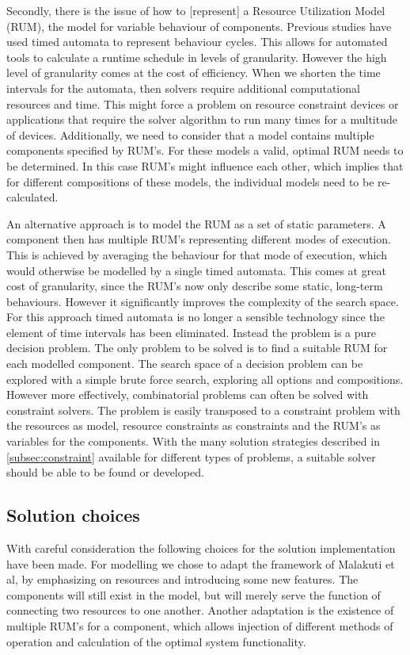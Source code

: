 Secondly, there is the issue of how to [represent] a Resource Utilization Model (RUM)\cite{steven-te-brinke}, the model for variable behaviour of components. Previous studies \cite{rum_basis_89, steven-te-brinke} have used timed automata to represent behaviour cycles. This allows for automated tools to calculate a runtime schedule in levels of granularity. However the high level of granularity comes at the cost of efficiency. When we shorten the time intervals for the automata, then solvers require additional computational resources and time. This might force a problem on resource constraint devices or applications that require the solver algorithm to run many times for a multitude of devices. Additionally, we need to consider that a model contains multiple components specified by RUM's. For these models a valid, optimal RUM needs to be determined. In this case RUM's might influence each other, which implies that for different compositions of these models, the individual models need to be re-calculated. %

An alternative approach is to model the RUM as a set of static parameters. A component then has multiple RUM's representing different modes of execution. This is achieved by averaging the behaviour for that mode of execution, which would otherwise be modelled by a single timed automata. This comes at great cost of granularity, since the RUM's now only describe some static, long-term behaviours. However it significantly improves the complexity of the search space. For this approach timed automata is no longer a sensible technology since the element of time intervals has been eliminated. Instead the problem is a pure decision problem\cite{decision_problem}. The only problem to be solved is to find a suitable RUM for each modelled component. The search space of a decision problem can be explored with a simple brute force search, exploring all options and compositions. However more effectively, combinatorial problems can often be solved with constraint solvers. The problem is easily transposed to a constraint problem with the resources as model, resource constraints as constraints and the RUM's as variables for the components. With the many solution strategies described in \ref{subsec:constraint} available for different types of problems, a suitable solver should be able to be found or developed.

\subsection{Solution choices}
\label{sub:choices}
With careful consideration the following choices for the solution implementation have been made. For modelling we chose to adapt the framework of Malakuti et al\cite{steven_te_brinke}, by emphasizing on resources and introducing some new features. The components will still exist in the model, but will merely serve the function of connecting two resources to one another. Another adaptation is the existence of multiple RUM's for a component, which allows injection of different methods of operation and calculation of the optimal system functionality.

